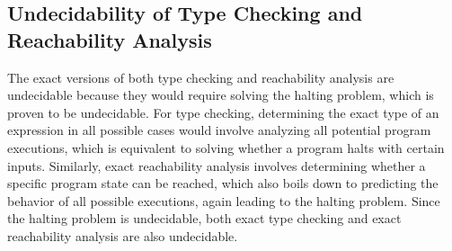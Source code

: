 \subsection{Undecidability of Type Checking and Reachability Analysis}
The exact versions of both type checking and reachability analysis are undecidable because they would require solving the halting problem, which is proven to be undecidable. For type checking, determining the exact type of an expression in all possible cases would involve analyzing all potential program executions, which is equivalent to solving whether a program halts with certain inputs. Similarly, exact reachability analysis involves determining whether a specific program state can be reached, which also boils down to predicting the behavior of all possible executions, again leading to the halting problem. Since the halting problem is undecidable, both exact type checking and exact reachability analysis are also undecidable.